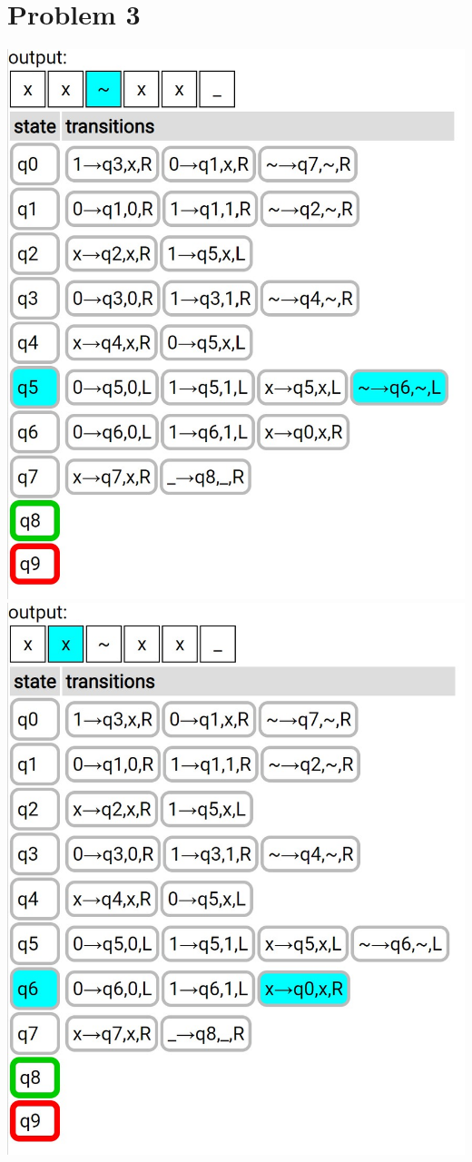 \documentclass{article}
\newenvironment{problem}[1]{
  \nobreak\section*{Problem #1}
}{}
\begin{document}
\begin{problem}{3}
\begin{center}
      \includegraphics[scale=0.5]{images/12.jpg}
      \includegraphics[scale=0.5]{images/13.jpg}

\end{center}
\end{problem}
\end{document}
